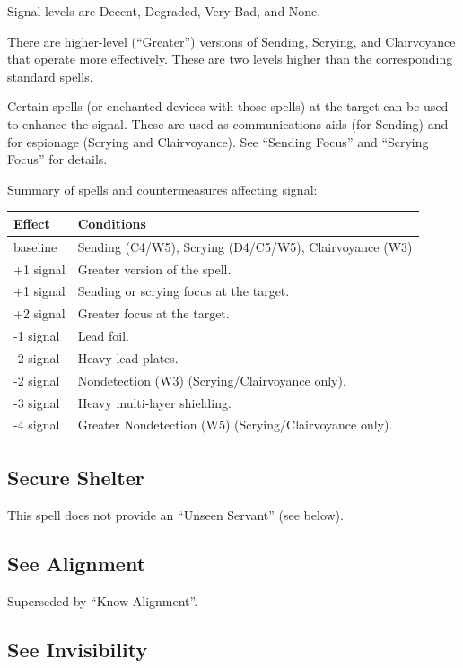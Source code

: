 Signal levels are Decent, Degraded, Very Bad, and None.

There are higher-level (``Greater'') versions of Sending, Scrying, and
Clairvoyance that operate more effectively. These are two levels higher
than the corresponding standard spells.

Certain spells (or enchanted devices with those spells) at the target can
be used to enhance the signal. These are used as communications aids (for
Sending) and for espionage (Scrying and Clairvoyance). See ``Sending Focus''
and ``Scrying Focus'' for details.

Summary of spells and countermeasures affecting signal:

\begin{tabular}{l|l}\hline
\textbf{Effect} & \textbf{Conditions} \\ \hline
%
baseline & Sending (C4/W5), Scrying (D4/C5/W5), Clairvoyance (W3) \\
\hline
%
+1 signal & Greater version of the spell. \\
+1 signal & Sending or scrying focus at the target. \\
+2 signal & Greater focus at the target. \\
\hline
%
-1 signal & Lead foil. \\
-2 signal & Heavy lead plates. \\
-2 signal & Nondetection (W3) (Scrying/Clairvoyance only). \\
-3 signal & Heavy multi-layer shielding. \\
-4 signal & Greater Nondetection (W5) (Scrying/Clairvoyance only). \\
\hline
%
\end{tabular}
%

%
\subsection{Secure Shelter}

This spell does not provide an ``Unseen Servant'' (see below).
%

%
\subsection{See Alignment}

Superseded by ``Know Alignment''.
%

%
\subsection{See Invisibility}

